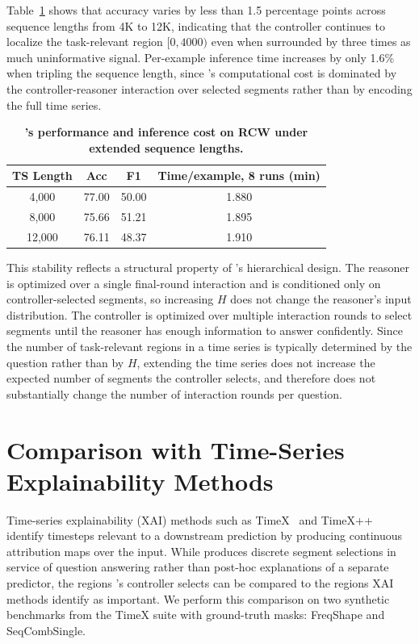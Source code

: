 Table~\ref{tab:scalability} shows that accuracy varies by less than 1.5 percentage points across sequence lengths from 4K to 12K, indicating that the controller continues to localize the task-relevant region $[0, 4000)$ even when surrounded by three times as much uninformative signal. Per-example inference time increases by only 1.6\% when tripling the sequence length, since \algoname's computational cost is dominated by the controller-reasoner interaction over selected segments rather than by encoding the full time series.

\begin{table}[h]
\centering
\small
\caption{\textbf{\algoname's performance and inference cost on RCW under extended sequence lengths.}}
\label{tab:scalability}
\setlength{\tabcolsep}{6pt}
\begin{tabular}{cccc}
\toprule
\textbf{TS Length} & \textbf{Acc} & \textbf{F1} & \textbf{Time/example, 8 runs (min)} \\
\midrule
4{,}000  & 77.00 & 50.00 & 1.880 \\
8{,}000  & 75.66 & 51.21 & 1.895 \\
12{,}000 & 76.11 & 48.37 & 1.910 \\
\bottomrule
\end{tabular}
\end{table}

This stability reflects a structural property of \algoname's hierarchical design. The reasoner is optimized over a single final-round interaction and is conditioned only on controller-selected segments, so increasing $H$ does not change the reasoner's input distribution. The controller is optimized over multiple interaction rounds to select segments until the reasoner has enough information to answer confidently. Since the number of task-relevant regions in a time series is typically determined by the question rather than by $H$, extending the time series does not increase the expected number of segments the controller selects, and therefore does not substantially change the number of interaction rounds per question.

\section{Comparison with Time-Series Explainability Methods}
\label{app:xai_comparison}

Time-series explainability (XAI) methods such as TimeX~\cite{queen2023timex} and TimeX++~\cite{liu2024timexplusplus} identify timesteps relevant to a downstream prediction by producing continuous attribution maps over the input. While \algoname produces discrete segment selections in service of question answering rather than post-hoc explanations of a separate predictor, the regions \algoname's controller selects can be compared to the regions XAI methods identify as important. We perform this comparison on two synthetic benchmarks from the TimeX suite with ground-truth masks: FreqShape and SeqCombSingle.

